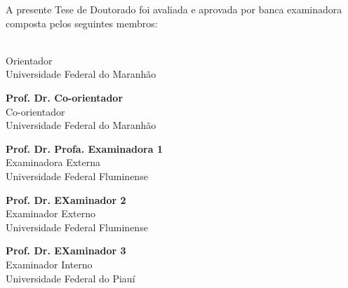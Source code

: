 \documentclass[
	12pt,				%
	oneside,			%
	a4paper,			%
	english,			%
	french,				%
	spanish,			%
	brazil				%
	]{abntex2}
\newcommand{\alinhadoesq}[1]{\noindent\begin{minipage}[top]{\textwidth}#1\end{minipage}}
\newcommand{\alinhadodir}[1]{\alinhadoesq{\begin{flushright}#1\end{flushright}}}
\newcommand{\myyear}{}
\newcommand{\mymonth}{}
\newcommand{\myday}{}
\begin{document}
      


\begin{folhadeaprovacao}

\alinhadodir{ \large\imprimirautor}

\vspace*{\fill}
\alinhadodir{ \bfseries\Large\imprimirtitulo}
\vspace*{\fill}

\hspace{.15\textwidth}
\begin{minipage}{.75\textwidth}
   A presente Tese de Doutorado foi avaliada e aprovada por banca examinadora composta pelos seguintes membros: 
\end{minipage} 
 
 \vspace{0.01\textwidth} 

\alinhadodir{ \textbf{\imprimirorientador} \\ Orientador\\ Universidade Federal do Maranhão }
 
\vspace{0.01\textwidth} 

\alinhadodir{ \textbf{Prof. Dr. Co-orientador} \\ Co-orientador\\ Universidade Federal do Maranhão }

\vspace{0.01\textwidth} 
\alinhadodir{\textbf{Prof. Dr. Profa. Examinadora 1} \\ Examinadora Externa\\ Universidade Federal Fluminense}

\vspace{0.01\textwidth} 
\alinhadodir{\textbf{Prof. Dr. EXaminador 2} \\ Examinador Externo \\ Universidade Federal Fluminense}

\vspace{0.01\textwidth} 
\alinhadodir{\textbf{Prof. Dr. EXaminador 3} \\ Examinador Interno \\ Universidade Federal do Piauí}

\vspace{0.03\textwidth} 


\end{folhadeaprovacao}
\end{document}
